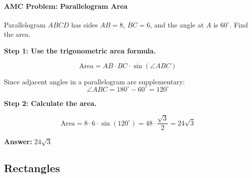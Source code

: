 ﻿\documentclass[12pt]{extarticle}
\begin{document}
\paragraph{AMC Problem: Parallelogram Area}

Parallelogram $ABCD$ has sides $AB = 8$, $BC = 6$, and the angle at $A$ is $60^{\circ}$. Find the area.

\begin{solutionbox}
\textbf{Step 1: Use the trigonometric area formula.}

\[\text{Area} = AB \cdot BC \cdot \sin(\angle ABC)\]

Since adjacent angles in a parallelogram are supplementary:
\[\angle ABC = 180^{\circ} - 60^{\circ} = 120^{\circ}\]

\textbf{Step 2: Calculate the area.}

\[\text{Area} = 8 \cdot 6 \cdot \sin(120^{\circ}) = 48 \cdot \frac{\sqrt{3}}{2} = 24\sqrt{3}\]

\textbf{Answer:} $\boxed{24\sqrt{3}}$
\end{solutionbox}

\subsection{Rectangles}
\end{document}

